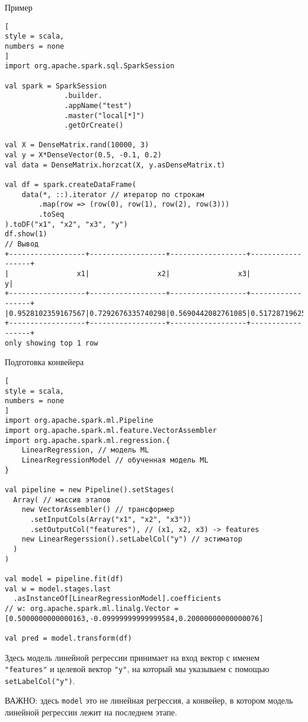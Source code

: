 \documentclass[%
	11pt,
	a4paper,
	utf8,
		]{article}
\begin{document}
Пример
\begin{lstlisting}[
style = scala,
numbers = none	
]
import org.apache.spark.sql.SparkSession

val spark = SparkSession
              .builder.
              .appName("test")
              .master("local[*]")
              .getOrCreate()
              
val X = DenseMatrix.rand(10000, 3)
val y = X*DenseVector(0.5, -0.1, 0.2)
val data = DenseMatrix.horzcat(X, y.asDenseMatrix.t)
              
val df = spark.createDataFrame(
    data(*, ::).iterator // итератор по строкам
        .map(row => (row(0), row(1), row(2), row(3)))
        .toSeq
).toDF("x1", "x2", "x3", "y")
df.show(1)
// Вывод
+------------------+------------------+------------------+------------------+
|                x1|                x2|                x3|                 y|
+------------------+------------------+------------------+------------------+
|0.9528102359167567|0.7292676335740298|0.5690442082761085|0.5172871962561971|
+------------------+------------------+------------------+------------------+
only showing top 1 row
\end{lstlisting}

Подготовка конвейера
\begin{lstlisting}[
style = scala,
numbers = none	
]
import org.apache.spark.ml.Pipeline
import org.apache.spark.ml.feature.VectorAssembler
import org.apache.spark.ml.regression.{
	LinearRegression, // модель ML
	LinearRegressionModel // обученная модель ML
}

val pipeline = new Pipeline().setStages(
  Array( // массив этапов
    new VectorAssembler() // трансформер
      .setInputCols(Array("x1", "x2", "x3"))
      .setOutputCol("features"), // (x1, x2, x3) -> features
    new LinearRegerssion().setLabelCol("y") // эстиматор
  )
)

val model = pipeline.fit(df)
val w = model.stages.last
  .asInstanceOf[LinearRegressionModel].coefficients
// w: org.apache.spark.ml.linalg.Vector = [0.5000000000000163,-0.09999999999999584,0.20000000000000076]

val pred = model.transform(df)
\end{lstlisting}

Здесь модель линейной регрессии принимает на вход вектор с именем \texttt{"features"} и целевой вектор \texttt{"y"}, на который мы указываем с помощью \texttt{setLabelCol("y")}.

ВАЖНО: здесь \texttt{model} это не линейная регрессия, а конвейер, в котором модель линейной регрессии лежит на последнем этапе.
\end{document}
